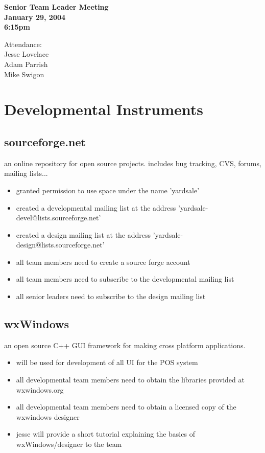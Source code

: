 \documentclass{article}
\begin{document}
\begin{flushleft}
{\bf Senior Team Leader Meeting}\\
{\bf January 29, 2004}\\
{\bf 6:15pm}\\
\end{flushleft}

\begin{flushleft}
Attendance:\\
Jesse Lovelace\\
Adam Parrish\\
Mike Swigon\\
\end{flushleft}

\section{Developmental Instruments}
\subsection{sourceforge.net}
an online repository for open source projects.  includes bug tracking, CVS, forums, mailing lists...
\begin{itemize}
    \item granted permission to use space under the name 'yardsale'
    \item created a developmental mailing list at the address 'yardsale-devel@lists.sourceforge.net'
    \item created a design mailing list at the address 'yardsale-design@lists.sourceforge.net'
    \item all team members need to create a source forge account
    \item all team members need to subscribe to the developmental mailing list
    \item all senior leaders need to subscribe to the design mailing list
\end{itemize}

\subsection{wxWindows}
an open source C++ GUI framework for making cross platform applications.
\begin{itemize}
    \item will be used for development of all UI for the POS system
    \item all developmental team members need to obtain the libraries provided at wxwindows.org
    \item all developmental team members need to obtain a licensed copy of the wxwindows designer
    \item jesse will provide a short tutorial explaining the basics of wxWindows/designer to the team
\end{itemize}
\end{document}
